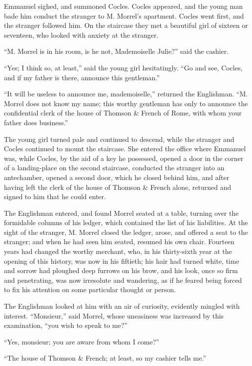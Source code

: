 Emmanuel sighed, and summoned Cocles. Cocles appeared, and the young
man bade him conduct the stranger to M. Morrel’s apartment. Cocles went
first, and the stranger followed him. On the staircase they met a
beautiful girl of sixteen or seventeen, who looked with anxiety at the
stranger.

“M. Morrel is in his room, is he not, Mademoiselle Julie?” said the
cashier.

“Yes; I think so, at least,” said the young girl hesitatingly. “Go and
see, Cocles, and if my father is there, announce this gentleman.”

“It will be useless to announce me, mademoiselle,” returned the
Englishman. “M. Morrel does not know my name; this worthy gentleman has
only to announce the confidential clerk of the house of Thomson \&
French of Rome, with whom your father does business.”

The young girl turned pale and continued to descend, while the stranger
and Cocles continued to mount the staircase. She entered the office
where Emmanuel was, while Cocles, by the aid of a key he possessed,
opened a door in the corner of a landing-place on the second staircase,
conducted the stranger into an antechamber, opened a second door, which
he closed behind him, and after having left the clerk of the house of
Thomson \& French alone, returned and signed to him that he could enter.

The Englishman entered, and found Morrel seated at a table, turning
over the formidable columns of his ledger, which contained the list of
his liabilities. At the sight of the stranger, M. Morrel closed the
ledger, arose, and offered a seat to the stranger; and when he had seen
him seated, resumed his own chair. Fourteen years had changed the
worthy merchant, who, in his thirty-sixth year at the opening of this
history, was now in his fiftieth; his hair had turned white, time and
sorrow had ploughed deep furrows on his brow, and his look, once so
firm and penetrating, was now irresolute and wandering, as if he feared
being forced to fix his attention on some particular thought or person.

The Englishman looked at him with an air of curiosity, evidently
mingled with interest. “Monsieur,” said Morrel, whose uneasiness was
increased by this examination, “you wish to speak to me?”

“Yes, monsieur; you are aware from whom I come?”

“The house of Thomson \& French; at least, so my cashier tells me.”

